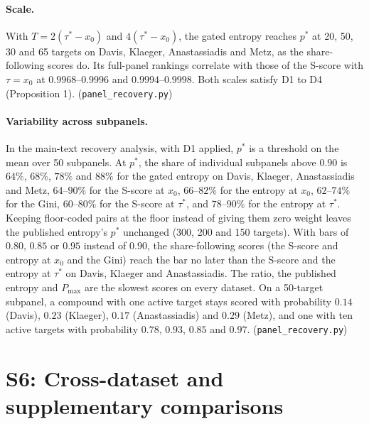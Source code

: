 \documentclass[11pt]{article}
\begin{document}
\paragraph{Scale.} With $T = 2(\tau^* - x_0)$ and $4(\tau^* - x_0)$, the gated
entropy reaches $p^*$ at 20, 50, 30 and 65 targets on Davis, Klaeger,
Anastassiadis and Metz, as the share-following scores do. Its full-panel
rankings correlate with those of the S-score with $\tau = x_0$ at
$0.9968$--$0.9996$ and $0.9994$--$0.9998$. Both scales satisfy D1 to D4
(Proposition 1). (\texttt{panel\_recovery.py})

\paragraph{Variability across subpanels.} In the main-text recovery analysis,
with D1 applied, $p^*$ is a threshold on the mean over 50 subpanels. At $p^*$, the share of
individual subpanels above $0.90$ is $64\%$, $68\%$, $78\%$ and $88\%$ for the
gated entropy on Davis, Klaeger, Anastassiadis and Metz, $64$--$90\%$ for the
S-score at $x_0$, $66$--$82\%$ for the entropy at $x_0$, $62$--$74\%$ for the
Gini, $60$--$80\%$ for the S-score at $\tau^*$, and $78$--$90\%$ for the entropy
at $\tau^*$. Keeping floor-coded pairs at the floor instead of giving them zero
weight leaves the published entropy's $p^*$ unchanged (300, 200 and 150
targets). With bars of $0.80$, $0.85$ or $0.95$ instead of $0.90$, the
share-following scores (the S-score and entropy at $x_0$ and the Gini) reach
the bar no later than the S-score and the entropy
at $\tau^*$ on Davis, Klaeger and Anastassiadis. The ratio, the published
entropy and $P_{\max}$ are the slowest scores on every dataset. On a 50-target
subpanel, a compound with one active target stays scored with probability
$0.14$ (Davis), $0.23$ (Klaeger), $0.17$ (Anastassiadis) and $0.29$ (Metz), and
one with ten active targets with probability $0.78$, $0.93$, $0.85$ and $0.97$.
(\texttt{panel\_recovery.py})

\clearpage
\section*{S6: Cross-dataset and supplementary comparisons}
\end{document}
